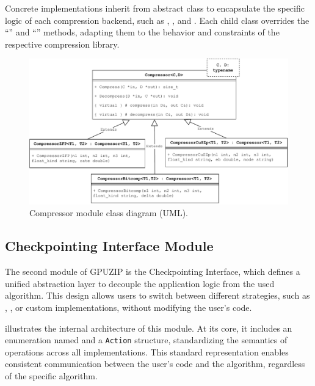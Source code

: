 \documentclass[Ingles]{ic-tese-v3}
\begin{document}
Concrete implementations inherit from  abstract class to encapsulate the specific logic of each compression backend, such as , , and . Each child class overrides the ``'' and ``''  methods, adapting them to the behavior and constraints of the respective compression library.

\begin{figure}
  \centering
  \includegraphics[width=1\linewidth,trim={0 0 0 0},clip]{figures/oss/compressor_uml.pdf}
  \caption[Compressor module class diagram]{Compressor module class diagram (UML).}
  \label{fig:compressoruml}
\end{figure}


\subsection{Checkpointing Interface Module}

The second module of GPUZIP is the Checkpointing Interface, which defines a unified abstraction layer to decouple the application logic from the used \checkpointing algorithm. This design allows users to switch between different \checkpointing strategies, such as \revolve, \zcut, or custom implementations, without modifying the user's code.

 illustrates the internal architecture of this module. At its core, it includes an enumeration named  and a \texttt{Action} structure, standardizing the semantics of \checkpointing operations across all implementations. This standard representation enables consistent communication between the user's code and the \checkpointing algorithm, regardless of the specific algorithm.
\end{document}

